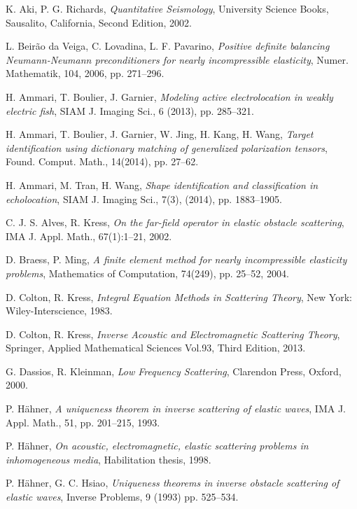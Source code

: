 \documentclass[a4paper,11pt]{article}
\theoremstyle{remark}
\theoremstyle{definition}
\numberwithin{equation}{section}
\begin{document}

\begin{thebibliography}{99}
 {K. Aki, P. G. Richards},  {\it Quantitative Seismology}, University Science Books, Sausalito, California, Second Edition, 2002.

 {L. Beir\~{a}o da Veiga, C. Lovadina, L. F. Pavarino}, {\it Positive definite balancing Neumann-Neumann preconditioners for nearly incompressible elasticity}, Numer. Mathematik, 104, 2006, pp. 271--296.

 {H. Ammari, T. Boulier, J. Garnier}, {\it Modeling active electrolocation in weakly
electric fish}, SIAM J. Imaging Sci., 6 (2013), pp. 285--321.

 {H. Ammari, T. Boulier, J. Garnier, W. Jing, H. Kang, H. Wang}, {\it Target identification using dictionary matching of generalized polarization tensors}, Found. Comput.
Math., 14(2014), pp. 27--62.

 {H. Ammari, M. Tran, H. Wang}, {\it Shape identification and classification in echolocation}, SIAM J. Imaging Sci., 7(3), (2014), pp. 1883--1905.


 {C. J. S. Alves, R. Kress}, {\it On the far-field operator in elastic obstacle scattering}, IMA J. Appl. Math.,
67(1):1--21, 2002.

 {D. Braess, P. Ming}, {\it A finite element method for nearly incompressible elasticity problems}, Mathematics of Computation, 74(249), pp. 25--52, 2004.


 {D. Colton, R. Kress}, {\it Integral Equation Methods in Scattering Theory}, New York: Wiley-Interscience, 1983.

 {D. Colton, R. Kress}, {\it Inverse Acoustic and Electromagnetic Scattering Theory}, Springer, Applied Mathematical Sciences Vol.93, Third Edition, 2013.

 {G. Dassios, R. Kleinman},  {\it Low Frequency Scattering}, Clarendon Press, Oxford, 2000.

 {P. H\"{a}hner}, {\it A uniqueness theorem in inverse scattering of elastic waves}, IMA J. Appl. Math., 51, pp. 201--215, 1993.

 {P. H\"{a}hner}, {\it On acoustic, electromagnetic, elastic scattering problems in inhomogeneous media}, Habilitation thesis, 1998.

 {P. H\"{a}hner,  G. C. Hsiao}, {\it Uniqueness theorems in inverse obstacle scattering of elastic waves}, Inverse Problems, 9 (1993) pp. 525--534.



\end{thebibliography}
\end{document}
